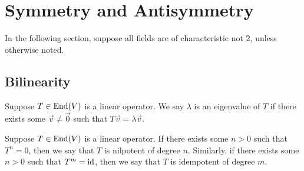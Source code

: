 \section{Symmetry and Antisymmetry}

\begin{remark}
    In the following section,
    suppose all fields are of characteristic not 2,
    unless otherwise noted.
\end{remark}

\subsection*{Bilinearity}

\begin{definition}
    Suppose \(T \in \operatorname{End}(V)\) is a linear operator.
    We say \(\lambda\) is an eigenvalue of \(T\)
    if there exists some \(\vec{v} \neq \vec{0}\) such that \(T\vec{v} = \lambda\vec{v}\).
\end{definition}
\begin{definition}
    Suppose \(T \in \operatorname{End}(V)\) is a linear operator.
    If there exists some \(n > 0\) such that \(T^n = 0\),
    then we say that \(T\) is nilpotent of degree \(n\).
    Similarly, if there exists some \(n > 0\) such that \(T^m = \operatorname{id}\),
    then we say that \(T\) is idempotent of degree \(m\).
\end{definition}

